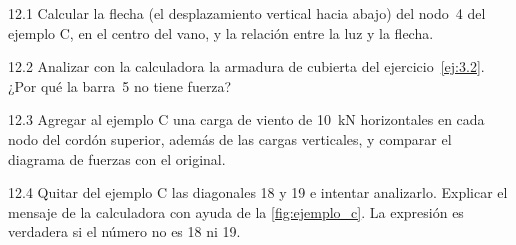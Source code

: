 \repasoyresumen


\ejercicios

\begin{ejercicio}{12.1}
Calcular la flecha (el desplazamiento vertical hacia abajo) del nodo~4 del
ejemplo C, en el centro del vano, y la relación entre la luz y la flecha.
\end{ejercicio}

\begin{ejercicio}{12.2}
Analizar con la calculadora la armadura de cubierta del ejercicio~\ref{ej:3.2}.
¿Por qué la barra~5 no tiene fuerza?
\end{ejercicio}

\begin{ejercicio}{12.3}
Agregar al ejemplo C una carga de viento de \SI{10}{\kilo\newton}
horizontales en cada nodo del cordón superior, además de las cargas
verticales, y comparar el diagrama de fuerzas con el original.
\end{ejercicio}

\begin{ejercicio}{12.4}
Quitar del ejemplo C las diagonales 18 y 19 e intentar analizarlo. Explicar
el mensaje de la calculadora con ayuda de la \cref{fig:ejemplo_c}. La
expresión  es verdadera si el número no es 18 ni 19.
\end{ejercicio}

